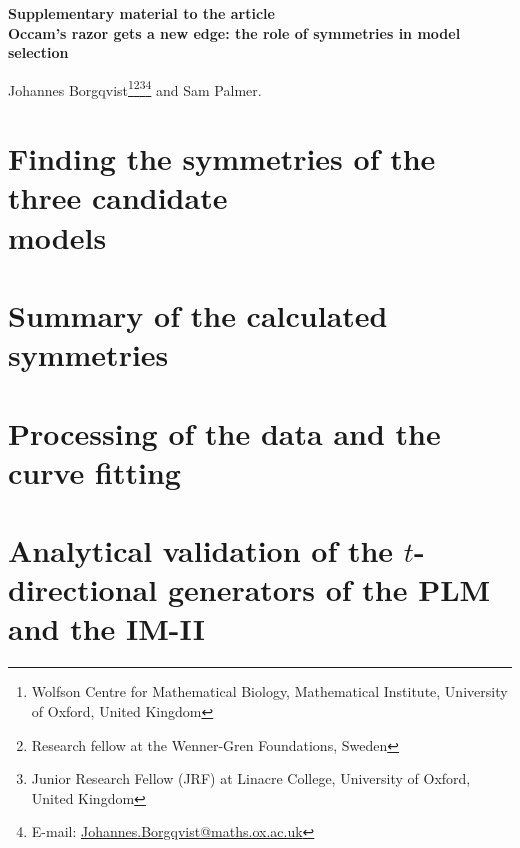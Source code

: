 \documentclass[12pt]{article}
\begin{document}
\begin{titlepage}
  \Large \textbf{Supplementary material to the article}\\[1cm]
  \Huge \textbf{Occam's razor gets a new edge: the role of symmetries in model selection}\\[1cm]\normalsize

 \vspace{3.0cm}
        \setcounter{footnote}{1}
       Johannes Borgqvist\footnote{\label{Oxford}Wolfson Centre for Mathematical Biology, Mathematical Institute, University of Oxford, United Kingdom}\footnote{\label{WennerGren} Research fellow at the Wenner-Gren Foundations, Sweden}\footnote{\label{Linacre} Junior Research Fellow (JRF) at Linacre College, University of Oxford, United Kingdom}\footnote{E-mail: \url{Johannes.Borgqvist@maths.ox.ac.uk}} and Sam Palmer.


  
\end{titlepage}

       \renewcommand*{\thefootnote}{\arabic{footnote}}
        \setcounter{footnote}{0}
\tableofcontents
\listoffigures
\listoftables
\newpage




\section{Finding the symmetries of the three candidate\\models}



\section{Summary of the calculated symmetries}



\section{Processing of the data and the curve fitting}




\section{Analytical validation of the $t$-directional generators of the PLM and the IM-II}
\end{document}
